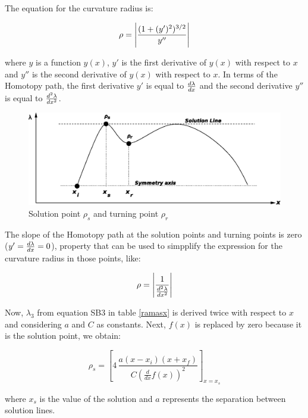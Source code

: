 \documentclass[conference,letterpaper,onecolumn]{IEEEtran}
\begin{document}
{The equation for the curvature radius is:

\begin{displaymath}
\rho=  \Bigg |{{(1 + (y')^2)^{3/2}} \over {y''}} \Bigg |
\end{displaymath}

where $y$ is a function $y(x)$, $y'$ is the first derivative of $y(x)$ with respect to $x$ and
$y''$ is the second derivative of $y(x)$ with respect to $x$. In terms of the Homotopy path, the first derivative $y'$ is equal to ${ {d \lambda} \over {dx}}$ and the second derivative $y''$ is equal to ${ {d^2 \lambda} \over {dx^2}}$.

\begin{figure}[hbtp]
\centering
\includegraphics[scale=0.8]{figs/chap3/figs/radiob.eps}
\caption{Solution point $\rho_s$ and turning point $\rho_r$}
\label{radio1}
\end{figure}

The slope of the Homotopy path at the solution points and turning points is zero ($y'={ {d \lambda} \over {dx}} =0$), property that can be used to simpplify the expression for the curvature radius in those points, like:

\begin{displaymath}
\rho= \Bigg | {1 \over {{ {d^2 \lambda} \over {dx^2}}}} \Bigg |
\end{displaymath}

Now, $\lambda_3$ from equation SB3 in table \ref{ramasx} is derived twice with respect to $x$ and considering $a$ and $C$ as constants. Next, $f(x)$ is replaced by zero because it is the solution point, we obtain:

\begin{displaymath}
\rho_{s}=\left[4\,{\frac {a \left( x-x_i \right)  \left( x+x_f \right) }{  C
   \left( {\frac {d}{dx}}f \left( x \right) \right)^{2}}}\right]_{x=x_s}
\end{displaymath}

where $x_s$ is the value of the solution and $a$ represents the separation between solution lines.

}
\end{document}
